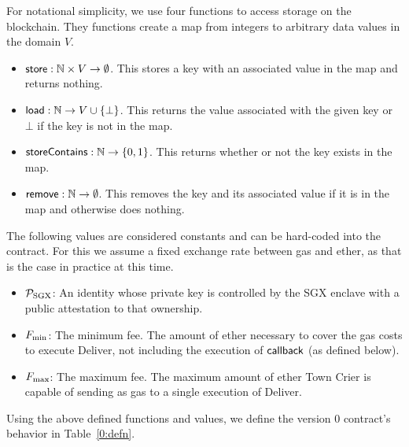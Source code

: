\documentclass[letterpaper,twocolumn,10pt]{article}
\begin{document}
For notational simplicity, we use four functions to access storage on the blockchain.
They functions create a map from integers to arbitrary data values in the domain $V$.
\begin{itemize}
  \item {${\sf store} : \mathbb{N} \times V \to \emptyset$.}
    This stores a key with an associated value in the map and returns nothing.

  \item {${\sf load} : \mathbb{N} \to V \cup \{\bot\}$.}
    This returns the value associated with the given key or $\bot$ if the key is not in the map.

  \item {${\sf storeContains} : \mathbb{N} \to \{0, 1\}$.}
    This returns whether or not the key exists in the map.

  \item {${\sf remove} : \mathbb{N} \to \emptyset$.}
    This removes the key and its associated value if it is in the map and otherwise does nothing.
\end{itemize}
The following values are considered constants and can be hard-coded into the contract.
For this we assume a fixed exchange rate between gas and ether, as that is the case in practice at this time.
\begin{itemize}
  \item $\mathcal{P}_{\rm SGX}$: An identity whose private key is controlled by the SGX enclave with a public attestation to that ownership.

  \item $F_{\rm min}$: The minimum fee. The amount of ether necessary to cover the gas costs to execute Deliver, not including the execution of ${\sf callback}$ (as defined below).

  \item $F_{\rm max}$: The maximum fee. The maximum amount of ether Town Crier is capable of sending as gas to a single execution of Deliver.
\end{itemize}
Using the above defined functions and values, we define the version 0 contract's behavior in Table~\ref{0:defn}.
\end{document}
